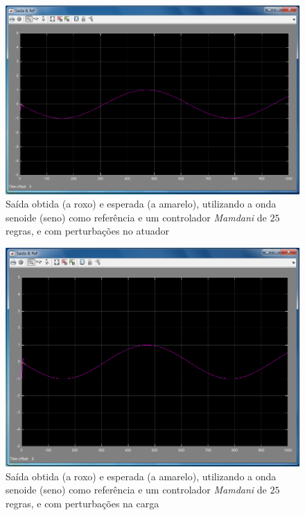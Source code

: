 \documentclass{article}
\begin{document}
\begin{figure}[h]
  \centering
      \includegraphics[scale=0.3]{Images/Mamdani_25_sin_actuator.png}
  \caption{Saída obtida (a roxo) e esperada (a amarelo), utilizando a onda senoide (seno) como referência e um controlador \emph{Mamdani} de $25$ regras, e com perturbações no atuador}
\end{figure}

\begin{figure}[h]
  \centering
      \includegraphics[scale=0.3]{Images/Mamdani_25_sin_charge.png}
  \caption{Saída obtida (a roxo) e esperada (a amarelo), utilizando a onda senoide (seno) como referência e um controlador \emph{Mamdani} de $25$ regras, e com perturbações na carga}
\end{figure}
\end{document}
